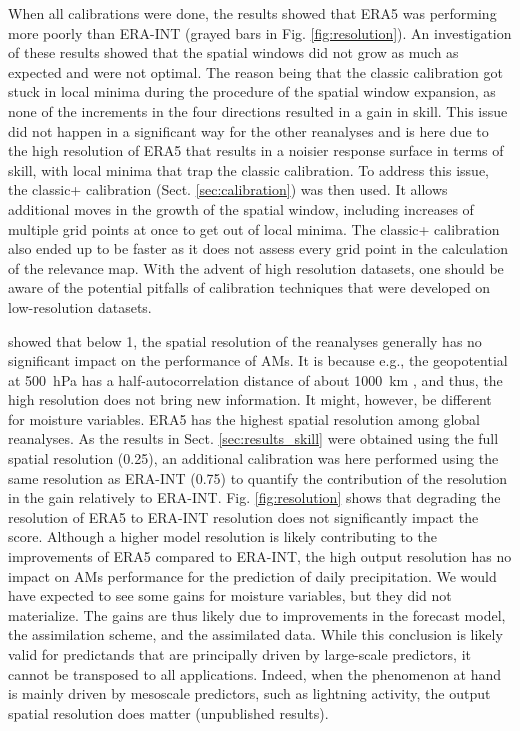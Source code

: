 \documentclass[alpha-refs]{wiley-article}
\begin{document}
When all calibrations were done, the results showed that ERA5 was performing more poorly than ERA-INT (grayed bars in Fig. \ref{fig:resolution}). An investigation of these results showed that the spatial windows did not grow as much as expected and were not optimal. The reason being that the classic calibration got stuck in local minima during the procedure of the spatial window expansion, as none of the increments in the four directions resulted in a gain in skill. This issue did not happen in a significant way for the other reanalyses and is here due to the high resolution of ERA5 that results in a noisier response surface in terms of skill, with local minima that trap the classic calibration. To address this issue, the classic+ calibration (Sect. \ref{sec:calibration}) was then used. It allows additional moves in the growth of the spatial window, including increases of multiple grid points at once to get out of local minima. The classic+ calibration also ended up to be faster as it does not assess every grid point in the calculation of the relevance map. With the advent of high resolution datasets, one should be aware of the potential pitfalls of calibration techniques that were developed on low-resolution datasets.

\citet{Horton2018b} showed that below 1\degree, the spatial resolution of the reanalyses generally has no significant impact on the performance of AMs. It is because e.g., the geopotential at 500~hPa has a half-autocorrelation distance of about 1000~km \cite{Thiebaux1985}, and thus, the high resolution does not bring new information. It might, however, be different for moisture variables. ERA5 has the highest spatial resolution among global reanalyses. As the results in Sect. \ref{sec:results_skill} were obtained using the full spatial resolution (0.25\degree), an additional calibration was here performed using the same resolution as ERA-INT (0.75\degree) to quantify the contribution of the resolution in the gain relatively to ERA-INT. Fig. \ref{fig:resolution} shows that degrading the resolution of ERA5 to ERA-INT resolution does not significantly impact the score. Although a higher model resolution is likely contributing to the improvements of ERA5 compared to ERA-INT, the high output resolution has no impact on AMs performance for the prediction of daily precipitation. We would have expected to see some gains for moisture variables, but they did not materialize. The gains are thus likely due to improvements in the forecast model, the assimilation scheme, and the assimilated data. While this conclusion is likely valid for predictands that are principally driven by large-scale predictors, it cannot be transposed to all applications. Indeed, when the phenomenon at hand is mainly driven by mesoscale predictors, such as lightning activity, the output spatial resolution does matter (unpublished results).
\end{document}
